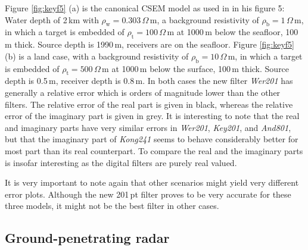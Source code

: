 \documentclass[paper,twocolumn,twoside]{geophysics}
\newcommand{\mr}[1]{\mathrm{#1}}
\begin{document}
Figure \ref{fig:keyf5} (a) is the canonical CSEM model as used in
\cite{GEO.12.Key} in his figure 5: Water depth of 2\,km with
$\rho_\mr{w}=0.303\,\Omega\,$m, a background resistivity of
$\rho_\mr{b}=1\,\Omega\,$m, in which a target is embedded of
$\rho_\mr{t}=100\,\Omega\,$m at 1000\,m below the seafloor, 100\,m thick.
Source depth is 1990\,m, receivers are on the seafloor.
%
%
Figure \ref{fig:keyf5} (b) is a land case, with a background resistivity
of $\rho_\mr{b}=10\,\Omega\,$m, in which a target is embedded of
$\rho_\mr{t}=500\,\Omega\,$m at 1000\,m below the surface, 100\,m thick. Source
depth is 0.5\,m, receiver depth is 0.8\,m. In both cases the new filter
\emph{Wer201} has generally a relative error which is orders of magnitude
lower than the other filters. The relative error of the real part is given
in black, whereas the relative error of the imaginary part is given in grey.
It is interesting to note that the real and imaginary parts have very similar
errors in \emph{Wer201}, \emph{Key201}, and \emph{And801}, but that the
imaginary part of \emph{Kong241} seems to behave considerably better for most
part than its real counterpart. To compare the real and the imaginary parts is
insofar interesting as the digital filters are purely real valued.

It is very important to note again that other scenarios might yield very
different error plots. Although the new 201\,pt filter proves to be very
accurate for these three models, it might not be the best filter in other
cases.

\subsection{Ground-penetrating radar}
\end{document}
